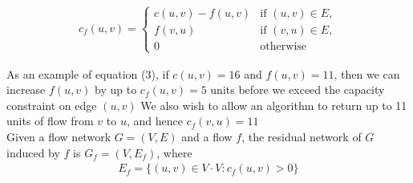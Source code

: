 \documentclass[12pt]{article}
\begin{document}
\begin{align}
 c_f(u,v) =
  \begin{cases}
  	c(u,v) - f(u,v) & \text{if } (u,v) \in E, \\
  	f(v,u) & \text{if } (v,u) \in E, \\
  	0 & \text{otherwise}
  \end{cases}
\end{align}

As an example of equation (3), if $c(u, v) = 16$ and $f(u, v) = 11$, then we can increase $f(u, v)$ by up to $c_f(u, v) = 5$ units before we exceed the capacity constraint on edge $(u, v)$ We also wish to allow an algorithm to return up to 11 units of flow from $v$ to $u$, and hence $c_f(v, u) = 11$\\

Given a flow network $G = (V, E)$ and a flow $f$, the residual network of $G$ induced by $f$ is $G_f = (V, E_f)$, where
\begin{align}
	E_f = \{(u, v) \in V \cdot V : c_f(u, v) > 0\}
\end{align} 
\end{document}

